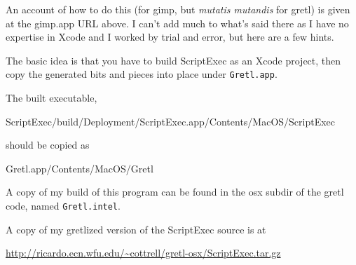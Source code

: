 \documentclass{article}
\begin{document}
An account of how to do this (for gimp, but \textit{mutatis mutandis}
for gretl) is given at the gimp.app URL above.  I can't add much to
what's said there as I have no expertise in Xcode and I worked by
trial and error, but here are a few hints.

The basic idea is that you have to build ScriptExec as an
Xcode project, then copy the generated bits and pieces into place
under \texttt{Gretl.app}.

The built executable,

\begin{code}
ScriptExec/build/Deployment/ScriptExec.app/Contents/MacOS/ScriptExec
\end{code}

should be copied as

\begin{code}
Gretl.app/Contents/MacOS/Gretl
\end{code}

A copy of my build of this program can be found in the osx subdir of
the gretl code, named \texttt{Gretl.intel}.

A copy of my gretlized version of the ScriptExec source is at

\url{http://ricardo.ecn.wfu.edu/~cottrell/gretl-osx/ScriptExec.tar.gz}
\end{document}
